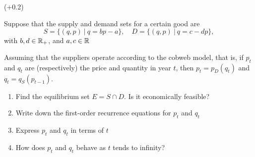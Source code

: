 \documentclass[9pt]{beamer}
\begin{document}
\begin{frame}{ (+0.2)} 

    Suppose that the supply and demand sets for a certain good are
    $$
    S = \{(q, p)\ |\ q = bp - a\}, \quad D = \{(q, p)\ |\ q = c - dp\},
    $$
    with $b, d \in \mathbb{R}_+$, and $a, c \in \mathbb{R}$
    
    Assuming that the suppliers operate according to the cobweb model, that is, if $p_t$ and $q_t$ are (respectively) the price and quantity in year $t$, then $p_t = p_D(q_t)$ and $q_t = q_S(p_{t-1})$. 

    \begin{enumerate}[leftmargin = 0.5cm, label = (\alph*), rightmargin = 0.2cm]
    
        \item Find the equilibrium set $E = S \cap D$. Is it economically feasible?

        \item Write down the first-order recurrence equations for $p_t$ and $q_t$

        \item Express $p_t$ and $q_t$ in terms of $t$
    
        \item How does $p_t$ and $q_t$ behave as $t$ tends to infinity?
    
    \end{enumerate}
    
\end{frame}



\end{document}
